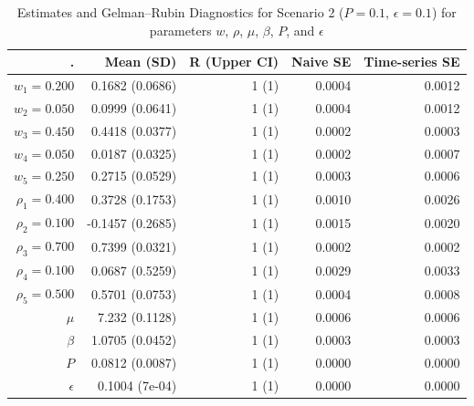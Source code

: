 \documentclass[
  letterpaper,
  double,
  12pt,
  1.0in]{beavtex}
\begin{document}
\begin{table}[ht]
\centering
\begin{tabular}{|r|r|r|r|r|}
  \hline
. & Mean (SD) & R (Upper CI) & Naive SE & Time-series SE \\ 
  \hline
$w_1 = 0.200$ & 0.1682 (0.0686) & 1 (1) & 0.0004 & 0.0012 \\ 
  $w_2 = 0.050$ & 0.0999 (0.0641) & 1 (1) & 0.0004 & 0.0012 \\ 
  $w_3 = 0.450$ & 0.4418 (0.0377) & 1 (1) & 0.0002 & 0.0003 \\ 
  $w_4 = 0.050$ & 0.0187 (0.0325) & 1 (1) & 0.0002 & 0.0007 \\ 
  $w_5 = 0.250$ & 0.2715 (0.0529) & 1 (1) & 0.0003 & 0.0006 \\ 
   \hline 
$\rho_1 = 0.400$ & 0.3728 (0.1753) & 1 (1) & 0.0010 & 0.0026 \\ 
  $\rho_2 = 0.100$ & -0.1457 (0.2685) & 1 (1) & 0.0015 & 0.0020 \\ 
  $\rho_3 = 0.700$ & 0.7399 (0.0321) & 1 (1) & 0.0002 & 0.0002 \\ 
  $\rho_4 = 0.100$ & 0.0687 (0.5259) & 1 (1) & 0.0029 & 0.0033 \\ 
  $\rho_5 = 0.500$ & 0.5701 (0.0753) & 1 (1) & 0.0004 & 0.0008 \\ 
   \hline 
$\mu$ & 7.232 (0.1128) & 1 (1) & 0.0006 & 0.0006 \\ 
  $\beta$ & 1.0705 (0.0452) & 1 (1) & 0.0003 & 0.0003 \\ 
  $P$ & 0.0812 (0.0087) & 1 (1) & 0.0000 & 0.0000 \\ 
  $\epsilon$ & 0.1004 (7e-04) & 1 (1) & 0.0000 & 0.0000 \\ 
   \hline
\end{tabular}
\caption{Estimates and Gelman--Rubin Diagnostics for Scenario 2 ($P = 0.1$, $\epsilon = 0.1$) for parameters $w$, $\rho$, $\mu$, $\beta$, $P$, and $\epsilon$} 
\end{table}
\end{document}

